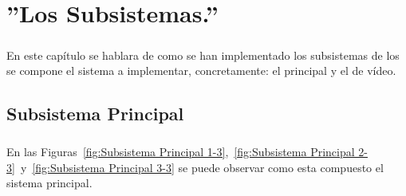 \documentclass[a4paper,12pt,titlepage,final]{book}
\begin{document}
\chapter{''Los Subsistemas.''}
\subsection*{}
\subsubsection*{}

\paragraph{}
En este capítulo se hablara de como se han implementado los subsistemas de los se compone el sistema a implementar, concretamente: el principal y el de vídeo. 

\section{Subsistema Principal}
\subsection*{}
\subsubsection*{}

\paragraph{}
En las Figuras~\ref{fig:Subsistema Principal 1-3},~\ref{fig:Subsistema Principal 2-3}~y~\ref{fig:Subsistema Principal 3-3} se puede observar como esta compuesto el sistema principal.
\end{document}
